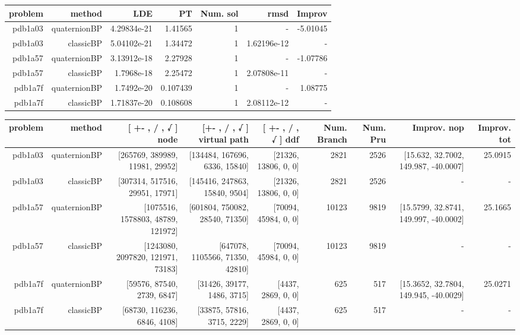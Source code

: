 \begin{table}
  \begin{tabular}{rrrrrrr}
    \hline\hline
    \textbf{problem} & \textbf{method} & \textbf{LDE} & \textbf{PT } & \textbf{Num. sol} & \textbf{rmsd} & \textbf{Improv} \\\hline
    pdb1a03 & quaternionBP & 4.29834e-21 & 1.41565 & 1 &  -  & -5.01045 \\
    pdb1a03 & classicBP & 5.04102e-21 & 1.34472 & 1 & 1.62196e-12 &  -  \\
    pdb1a57 & quaternionBP & 3.13912e-18 & 2.27928 & 1 &  -  & -1.07786 \\
    pdb1a57 & classicBP & 1.7968e-18 & 2.25472 & 1 & 2.07808e-11 &  -  \\
    pdb1a7f & quaternionBP & 1.7492e-20 & 0.107439 & 1 &  -  & 1.08775 \\
    pdb1a7f & classicBP & 1.71837e-20 & 0.108608 & 1 & 2.08112e-12 &  -  \\\hline\hline
  \end{tabular}
\end{table}
\begin{table}
  \begin{tabular}{rrrrrrrrr}
    \hline\hline
    \textbf{problem} & \textbf{method} & \textbf{ [ +- , / , √ ] node} & \textbf{ [+- , / , √ ] virtual path} & \textbf{ [ +- , / , √ ] ddf } & \textbf{ Num. Branch } & \textbf{ Num. Pru } & \textbf{Improv. nop} & \textbf{Improv. tot} \\\hline
    pdb1a03 & quaternionBP & [265769, 389989, 11981, 29952] & [134484, 167696, 6336, 15840] & [21326, 13806, 0, 0] & 2821 & 2526 & [15.632, 32.7002, 149.987, -40.0007] & 25.0915 \\
    pdb1a03 & classicBP & [307314, 517516, 29951, 17971] & [145416, 247863, 15840, 9504] & [21326, 13806, 0, 0] & 2821 & 2526 &  -  &  -  \\
    pdb1a57 & quaternionBP & [1075516, 1578803, 48789, 121972] & [601804, 750082, 28540, 71350] & [70094, 45984, 0, 0] & 10123 & 9819 & [15.5799, 32.8741, 149.997, -40.0002] & 25.1665 \\
    pdb1a57 & classicBP & [1243080, 2097820, 121971, 73183] & [647078, 1105566, 71350, 42810] & [70094, 45984, 0, 0] & 10123 & 9819 &  -  &  -  \\
    pdb1a7f & quaternionBP & [59576, 87540, 2739, 6847] & [31426, 39177, 1486, 3715] & [4437, 2869, 0, 0] & 625 & 517 & [15.3652, 32.7804, 149.945, -40.0029] & 25.0271 \\
    pdb1a7f & classicBP & [68730, 116236, 6846, 4108] & [33875, 57816, 3715, 2229] & [4437, 2869, 0, 0] & 625 & 517 &  -  &  -  \\\hline\hline
  \end{tabular}
\end{table}

